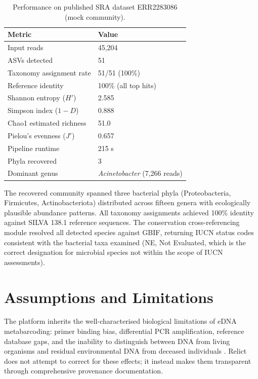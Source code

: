 \documentclass[runningheads]{llncs}
\begin{document}
\begin{table}[t]
\centering
\caption{Performance on published SRA dataset ERR2283086 (mock community).}
\label{tab:sra}
\begin{tabular}{ll}
\toprule
\textbf{Metric} & \textbf{Value} \\
\midrule
Input reads              & 45,204 \\
ASVs detected            & 51 \\
Taxonomy assignment rate & 51/51 (100\%) \\
Reference identity       & 100\% (all top hits) \\
Shannon entropy ($H'$)   & 2.585 \\
Simpson index ($1-D$)    & 0.888 \\
Chao1 estimated richness & 51.0 \\
Pielou's evenness ($J'$) & 0.657 \\
Pipeline runtime         & 215 s \\
Phyla recovered          & 3 \\
Dominant genus           & \textit{Acinetobacter} (7,266 reads) \\
\bottomrule
\end{tabular}
\end{table}

The recovered community spanned three bacterial phyla (Proteobacteria, Firmicutes, Actinobacteriota) distributed across fifteen genera with ecologically plausible abundance patterns. All taxonomy assignments achieved 100\% identity against SILVA 138.1 reference sequences. The conservation cross-referencing module resolved all detected species against GBIF, returning IUCN status codes consistent with the bacterial taxa examined (NE, Not Evaluated, which is the correct designation for microbial species not within the scope of IUCN assessments).

\section{Assumptions and Limitations}

The platform inherits the well-characterised biological limitations of eDNA metabarcoding: primer binding bias, differential PCR amplification, reference database gaps, and the inability to distinguish between DNA from living organisms and residual environmental DNA from deceased individuals \cite{taberlet2012}. Relict does not attempt to correct for these effects; it instead makes them transparent through comprehensive provenance documentation.
\end{document}
